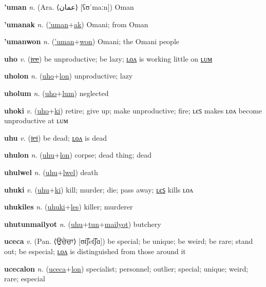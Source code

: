 \textbf{\hypertarget{'uman}{'uman}} \textit{n.} (Ara. ⟨{\arabics{}عمان‎}⟩ [ʕʊˈmaːn])
Oman

\textbf{\hypertarget{'umanak}{'umanak}} \textit{n.} (\hyperlink{'uman}{'uman}+\allowbreak \hyperlink{ak}{ak})
Omani; from Oman

\textbf{\hypertarget{'umanwon}{'umanwon}} \textit{n.} (\hyperlink{'uman}{'uman}+\allowbreak \hyperlink{won}{won})
Omani; the Omani people

\textbf{\hypertarget{uho}{uho}} \textit{v.} (\hyperlink{ice}{\sout{ice}})
be unproductive; be lazy; \hyperlink{uholon}{ʟᴏᴧ} is working little on \hyperlink{uholum}{ʟᴜᴍ}

\textbf{\hypertarget{uholon}{uholon}} \textit{n.} (\hyperlink{uho}{uho}+\allowbreak \hyperlink{lon}{lon})
unproductive; lazy

\textbf{\hypertarget{uholum}{uholum}} \textit{n.} (\hyperlink{uho}{uho}+\allowbreak \hyperlink{lum}{lum})
neglected

\textbf{\hypertarget{uhoki}{uhoki}} \textit{v.} (\hyperlink{uho}{uho}+\allowbreak \hyperlink{ki}{ki})
retire; give up; make unproductive; fire; ʟєꜱ makes ʟᴏᴧ become unproductive at ʟᴜᴍ

\textbf{\hypertarget{uhu}{uhu}} \textit{v.} (\hyperlink{ici}{\sout{ici}})
be dead; \hyperlink{uhulon}{ʟᴏᴧ} is dead

\textbf{\hypertarget{uhulon}{uhulon}} \textit{n.} (\hyperlink{uhu}{uhu}+\allowbreak \hyperlink{lon}{lon})
corpse; dead thing; dead

\textbf{\hypertarget{uhulwel}{uhulwel}} \textit{n.} (\hyperlink{uhu}{uhu}+\allowbreak \hyperlink{lwel}{lwel})
death

\textbf{\hypertarget{uhuki}{uhuki}} \textit{v.} (\hyperlink{uhu}{uhu}+\allowbreak \hyperlink{ki}{ki})
kill; murder; die; pass away; \hyperlink{uhukiles}{ʟєꜱ} kills ʟᴏᴧ

\textbf{\hypertarget{uhukiles}{uhukiles}} \textit{n.} (\hyperlink{uhuki}{uhuki}+\allowbreak \hyperlink{les}{les})
killer; murderer

\textbf{\hypertarget{uhutunmailyot}{uhutunmailyot}} \textit{n.} (\hyperlink{uhu}{uhu}+\allowbreak \hyperlink{tun}{tun}+\allowbreak \hyperlink{mailyot}{mailyot})
butchery

\textbf{\hypertarget{uceca}{uceca}} \textit{v.} (Pan. ⟨{\gurmukhi{}ਉਚੇਚਾ}⟩ [ʊt͡ʃet͡ʃɑ])
be special; be unique; be weird; be rare; stand out; be especial; \hyperlink{ucecalon}{ʟᴏᴧ} is distinguished from those around it

\textbf{\hypertarget{ucecalon}{ucecalon}} \textit{n.} (\hyperlink{uceca}{uceca}+\allowbreak \hyperlink{lon}{lon})
specialist; personnel; outlier; special; unique; weird; rare; especial

